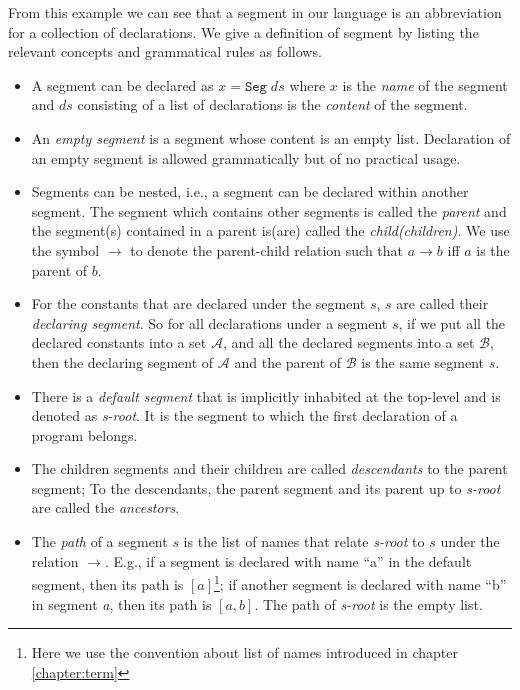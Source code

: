 From this example we can see that a segment in our language is an abbreviation for a collection of declarations. We give a definition of segment by listing the relevant concepts and grammatical rules as follows.
\begin{definition}[Segment]
  \leavevmode \vspace{-\baselineskip}
  \begin{itemize}
  \item A segment can be declared as $x = \texttt{Seg}\;ds$ where $x$ is the \emph{name} of the segment and $ds$ consisting of a list of declarations is the \emph{content} of the segment.
  \item An \emph{empty segment} is a segment whose content is an empty list. Declaration of an empty segment is allowed grammatically but of no practical usage.
  \item Segments can be nested, i.e., a segment can be declared within another segment. The segment which contains other segments is called the \emph{parent} and the segment(s) contained in a parent is(are) called the \emph{child(children)}. We use the symbol $\to$ to denote the parent-child relation such that $a \to b$ iff $a$ is the parent of $b$.
  \item For the constants that are declared under the segment $s$, $s$ are called their \emph{declaring segment}. So for all declarations under a segment $s$, if we put all the declared constants into a set $\mathcal{A}$, and all the declared segments into a set $\mathcal{B}$, then the declaring segment of $\mathcal{A}$ and the parent of $\mathcal{B}$ is the same segment $s$. 
  \item There is a \emph{default segment} that is implicitly inhabited at the top-level and is denoted as \emph{s-root}. It is the segment to which the first declaration of a program belongs.
  \item The children segments and their children are called \emph{descendants} to the parent segment; To the descendants, the parent segment and its parent up to \emph{s-root} are called the \emph{ancestors}.
  \item The \emph{path} of a segment $s$ is the list of names that relate \emph{s-root} to $s$ under the relation $\to$. E.g., if a segment is declared with name ``a'' in the default segment, then its path is $[a]$\footnote{Here we use the convention about list of names introduced in chapter \ref{chapter:term}}; if another segment is declared with name ``b'' in segment \emph{a}, then its path is $[a,b]$. The path of \emph{s-root} is the empty list.

\end{itemize}
\end{definition}
